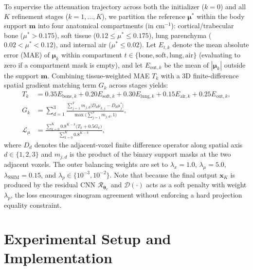 \documentclass[11pt, a4paper]{article}
\begin{document}
To supervise the attenuation trajectory across both the initializer ($k=0$) and all $K$ refinement stages ($k=1, \dots, K$), we partition the reference $\boldsymbol{\mu}^*$ within the body support $\mathbf{m}$ into four anatomical compartments (in $\text{cm}^{-1}$): cortical/trabecular bone ($\mu^* > 0.175$), soft tissue ($0.12 \le \mu^* \le 0.175$), lung parenchyma ($0.02 < \mu^* < 0.12$), and internal air ($\mu^* \le 0.02$). Let $E_{t,k}$ denote the mean absolute error (MAE) of $\boldsymbol{\mu}_k$ within compartment $t \in \{\text{bone}, \text{soft}, \text{lung}, \text{air}\}$ (evaluating to zero if a compartment mask is empty), and let $E_{\text{out},k}$ be the mean of $|\boldsymbol{\mu}_k|$ outside the support $\mathbf{m}$. Combining tissue-weighted MAE $T_k$ with a 3D finite-difference spatial gradient matching term $G_k$ across stages yields:
\begin{align}
T_k &= 0.35 E_{\text{bone},k} + 0.20 E_{\text{soft},k} + 0.30 E_{\text{lung},k} + 0.15 E_{\text{air},k} + 0.25 E_{\text{out},k}, \\
G_k &= \sum_{d=1}^{3} \frac{\sum_{j=1}^V m_{j,d} \big| D_d \mu_{k,j} - D_d \mu_j^* \big|}{\max\!\big(\sum_{j=1}^V m_{j,d}, 1\big)}, \\
\mathcal{L}_\mu &= \frac{\sum_{k=0}^{K} 0.8^{K-k} \big( T_k + 0.5 G_k \big)}{\sum_{k=0}^{K} 0.8^{K-k}},
\end{align}
where $D_d$ denotes the adjacent-voxel finite difference operator along spatial axis $d \in \{1, 2, 3\}$ and $m_{j,d}$ is the product of the binary support masks at the two adjacent voxels. The outer balancing weights are set to $\lambda_x = 1.0$, $\lambda_\mu = 5.0$, $\lambda_{\text{SSIM}} = 0.15$, and $\lambda_p \in \{10^{-3}, 10^{-2}\}$. Note that because the final output $\mathbf{x}_K$ is produced by the residual CNN $\mathcal{R}_{\boldsymbol{\theta}_x}$ and $\mathcal{D}(\cdot)$ acts as a soft penalty with weight $\lambda_p$, the loss encourages sinogram agreement without enforcing a hard projection equality constraint.

\section{Experimental Setup and Implementation}
\end{document}
